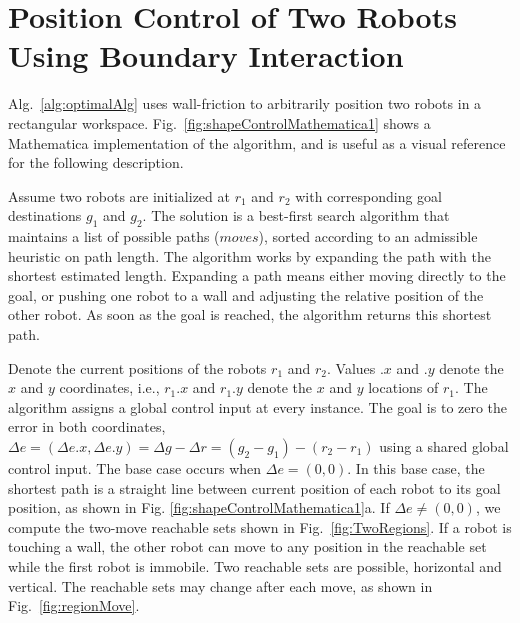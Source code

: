 

\section{Position Control of Two Robots Using Boundary Interaction}\label{sec:PostionControl2Robots}


Alg.~\ref{alg:optimalAlg} uses wall-friction to arbitrarily position two robots in a rectangular workspace. 
 Fig.~\ref{fig:shapeControlMathematica1} shows a Mathematica implementation of the algorithm, and is useful as a visual reference for the following description.

Assume two robots are initialized at $r_1$ and $r_2$ with corresponding goal destinations $g_1$ and $g_2$. 
The solution is a best-first search algorithm that maintains a list of possible paths ($moves$), sorted according to an admissible heuristic on path length.
The algorithm works by expanding the path with the shortest estimated length.
Expanding a path means either moving directly to the goal, or pushing one robot to a wall and adjusting the relative position of the other robot.
As soon as the goal is reached, the algorithm returns this shortest path.

Denote the current positions of the robots  $r_1$ and $r_2$. 
Values $.x$ and $.y$ denote the $x$ and $y$ coordinates, i.e., $r_1.x$ and $r_1.y$ denote the $x$ and $y$ locations of $r_1$. 
The algorithm assigns a global control input at every instance.
The goal is to zero the error in both coordinates,
 $\Delta e =(\Delta e.x, \Delta e.y) =\Delta g - \Delta r = (g_2-g_1)- (r_2-r_1)$ using a shared global control input. 
 The base case occurs when $\Delta e = (0,0)$. In this base case, the shortest path is a straight line between current position of each robot to its goal position, as shown in Fig. \ref{fig:shapeControlMathematica1}a.  
If  $\Delta e\neq (0,0)$, we compute the two-move reachable sets shown in Fig.~\ref{fig:TwoRegions}.
 If a robot is touching a wall, the other robot can move to any position in the reachable set while the first robot is immobile. 
Two reachable sets are possible, horizontal and vertical. 
The reachable sets may change after each move, as shown in  Fig.~\ref{fig:regionMove}.
   

